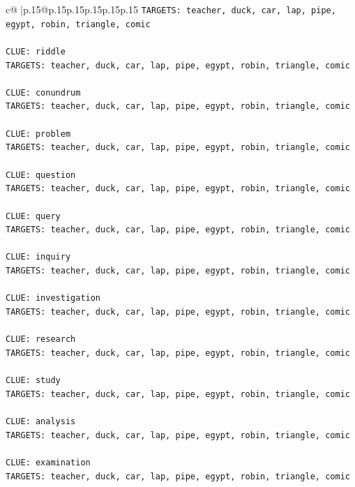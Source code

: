 \documentclass{article}
\begin{document}
{\begin{supertabular}{c@{$\;$}|p{.15\linewidth}@{}p{.15\linewidth}p{.15\linewidth}p{.15\linewidth}p{.15\linewidth}p{.15\linewidth}}
{{{\texttt{TARGETS: teacher, duck, car, lap, pipe, egypt, robin, triangle, comic} \\
\\ 
\texttt{CLUE: riddle} \\
\texttt{TARGETS: teacher, duck, car, lap, pipe, egypt, robin, triangle, comic} \\
\\ 
\texttt{CLUE: conundrum} \\
\texttt{TARGETS: teacher, duck, car, lap, pipe, egypt, robin, triangle, comic} \\
\\ 
\texttt{CLUE: problem} \\
\texttt{TARGETS: teacher, duck, car, lap, pipe, egypt, robin, triangle, comic} \\
\\ 
\texttt{CLUE: question} \\
\texttt{TARGETS: teacher, duck, car, lap, pipe, egypt, robin, triangle, comic} \\
\\ 
\texttt{CLUE: query} \\
\texttt{TARGETS: teacher, duck, car, lap, pipe, egypt, robin, triangle, comic} \\
\\ 
\texttt{CLUE: inquiry} \\
\texttt{TARGETS: teacher, duck, car, lap, pipe, egypt, robin, triangle, comic} \\
\\ 
\texttt{CLUE: investigation} \\
\texttt{TARGETS: teacher, duck, car, lap, pipe, egypt, robin, triangle, comic} \\
\\ 
\texttt{CLUE: research} \\
\texttt{TARGETS: teacher, duck, car, lap, pipe, egypt, robin, triangle, comic} \\
\\ 
\texttt{CLUE: study} \\
\texttt{TARGETS: teacher, duck, car, lap, pipe, egypt, robin, triangle, comic} \\
\\ 
\texttt{CLUE: analysis} \\
\texttt{TARGETS: teacher, duck, car, lap, pipe, egypt, robin, triangle, comic} \\
\\ 
\texttt{CLUE: examination} \\
\texttt{TARGETS: teacher, duck, car, lap, pipe, egypt, robin, triangle, comic} \\
}}}
\end{supertabular}}
\end{document}
